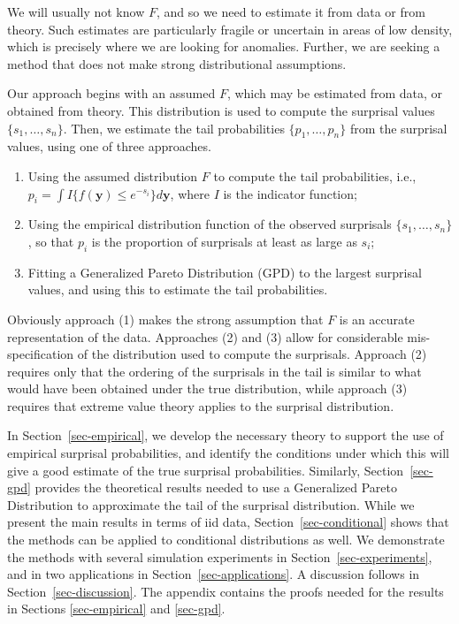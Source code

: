 \documentclass[
  12pt]{article}
\providecommand{\tightlist}{%
  \setlength{\itemsep}{0pt}\setlength{\parskip}{0pt}}
\theoremstyle{plain}
\theoremstyle{plain}
\theoremstyle{definition}
\theoremstyle{plain}
\theoremstyle{remark}
\begin{document}
We will usually not know \(F\), and so we need to estimate it from data
or from theory. Such estimates are particularly fragile or uncertain in
areas of low density, which is precisely where we are looking for
anomalies. Further, we are seeking a method that does not make strong
distributional assumptions.

Our approach begins with an assumed \(F\), which may be estimated from
data, or obtained from theory. This distribution is used to compute the
surprisal values \(\{s_1,\dots,s_n\}\). Then, we estimate the tail
probabilities \(\{p_1,\dots,p_n\}\) from the surprisal values, using one
of three approaches.

\begin{enumerate}
\def\labelenumi{(\arabic{enumi})}
\tightlist
\item
  Using the assumed distribution \(F\) to compute the tail
  probabilities, i.e.,
  \(p_i = \int I\{f(\bm{y})\le e^{-s_i}\} d\bm{y}\), where \(I\) is the
  indicator function;
\item
  Using the empirical distribution function of the observed surprisals
  \(\{s_1,\dots,s_n\}\), so that \(p_i\) is the proportion of surprisals
  at least as large as \(s_i\);
\item
  Fitting a Generalized Pareto Distribution (GPD) to the largest
  surprisal values, and using this to estimate the tail probabilities.
\end{enumerate}

Obviously approach (1) makes the strong assumption that \(F\) is an
accurate representation of the data. Approaches (2) and (3) allow for
considerable mis-specification of the distribution used to compute the
surprisals. Approach (2) requires only that the ordering of the
surprisals in the tail is similar to what would have been obtained under
the true distribution, while approach (3) requires that extreme value
theory applies to the surprisal distribution.

In Section~\ref{sec-empirical}, we develop the necessary theory to
support the use of empirical surprisal probabilities, and identify the
conditions under which this will give a good estimate of the true
surprisal probabilities. Similarly, Section~\ref{sec-gpd} provides the
theoretical results needed to use a Generalized Pareto Distribution to
approximate the tail of the surprisal distribution. While we present the
main results in terms of iid data, Section~\ref{sec-conditional} shows
that the methods can be applied to conditional distributions as well. We
demonstrate the methods with several simulation experiments in
Section~\ref{sec-experiments}, and in two applications in
Section~\ref{sec-applications}. A discussion follows in
Section~\ref{sec-discussion}. The appendix contains the proofs needed
for the results in Sections \ref{sec-empirical} and \ref{sec-gpd}.
\end{document}
